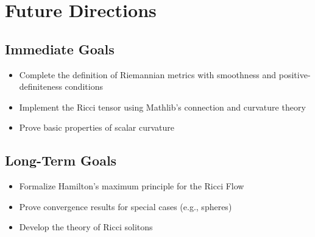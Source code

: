 \chapter{Future Directions}

\section{Immediate Goals}
\begin{itemize}
\item Complete the definition of Riemannian metrics with smoothness and positive-definiteness conditions
\item Implement the Ricci tensor using Mathlib's connection and curvature theory
\item Prove basic properties of scalar curvature
\end{itemize}

\section{Long-Term Goals}
\begin{itemize}
\item Formalize Hamilton's maximum principle for the Ricci Flow
\item Prove convergence results for special cases (e.g., spheres)
\item Develop the theory of Ricci solitons
\end{itemize}

